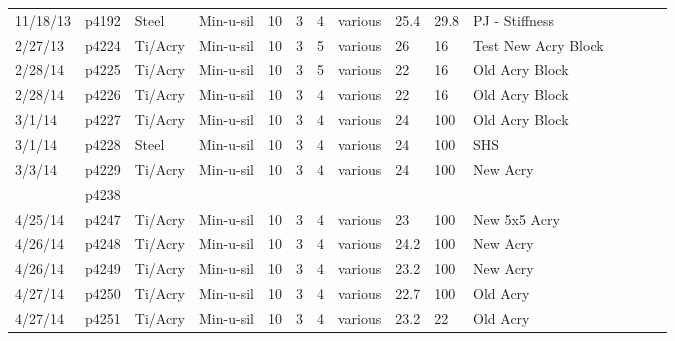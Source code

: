 \begin{landscape}
\begin{longtable} {lllllllllllllll}
11/18/13 & p4192      & Steel            & Min-u-sil    & 10           & 3         & 4             & various                      & 25.4        & 29.8     & PJ - Stiffness\\
2/27/13  & p4224      & Ti/Acry & Min-u-sil    & 10           & 3         & 5             & various                      & 26          & 16       & Test New Acry Block\\
2/28/14  & p4225      & Ti/Acry & Min-u-sil    & 10           & 3         & 5             & various                      & 22          & 16       & Old Acry Block\\
2/28/14  & p4226      & Ti/Acry & Min-u-sil    & 10           & 3         & 4             & various                      & 22          & 16       & Old Acry Block\\
3/1/14   & p4227      & Ti/Acry & Min-u-sil    & 10           & 3         & 4             & various                      & 24          & 100      & Old Acry Block\\
3/1/14   & p4228      & Steel            & Min-u-sil    & 10           & 3         & 4             & various                      & 24          & 100      & SHS\\
3/3/14   & p4229      & Ti/Acry & Min-u-sil    & 10           & 3         & 4             & various                      & 24          & 100      & New Acry\\
         & p4238      &                  &              &              &           &               &                              &             &          &                                                 \\
4/25/14  & p4247      & Ti/Acry & Min-u-sil    & 10           & 3         & 4             & various                      & 23          & 100      & New 5x5 Acry\\
4/26/14  & p4248      & Ti/Acry & Min-u-sil    & 10           & 3         & 4             & various                      & 24.2        & 100      & New Acry\\
4/26/14  & p4249      & Ti/Acry & Min-u-sil    & 10           & 3         & 4             & various                      & 23.2        & 100      & New Acry\\
4/27/14  & p4250      & Ti/Acry & Min-u-sil    & 10           & 3         & 4             & various                      & 22.7        & 100      & Old Acry\\
4/27/14  & p4251      & Ti/Acry & Min-u-sil    & 10           & 3         & 4             & various                      & 23.2        & 22       & Old Acry\\

\end{longtable}
\end{landscape}
